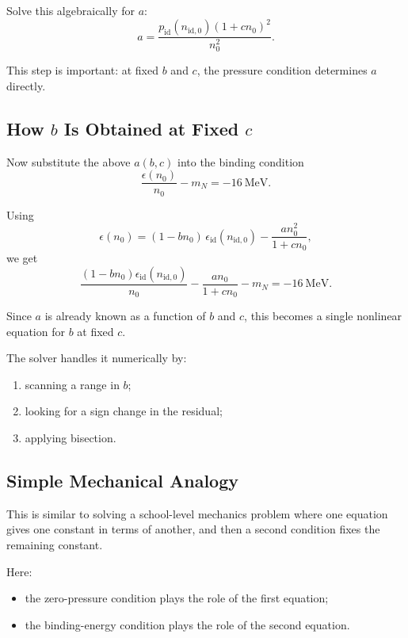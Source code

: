 \documentclass[11pt]{article}
\begin{document}
Solve this algebraically for $a$:
\begin{equation}
a
=
\frac{p_{\mathrm{id}}(n_{\mathrm{id},0})(1+cn_0)^2}{n_0^2}.
\end{equation}

This step is important: at fixed $b$ and $c$, the pressure condition determines
$a$ directly.

\subsection{How \texorpdfstring{$b$}{b} Is Obtained at Fixed \texorpdfstring{$c$}{c}}

Now substitute the above $a(b,c)$ into the binding condition
\begin{equation}
\frac{\epsilon(n_0)}{n_0}-m_N=-16\ \mathrm{MeV}.
\end{equation}

Using
\begin{equation}
\epsilon(n_0)
=
(1-bn_0)\,\epsilon_{\mathrm{id}}(n_{\mathrm{id},0})
-\frac{a n_0^2}{1+cn_0},
\end{equation}
we get
\begin{equation}
\frac{(1-bn_0)\epsilon_{\mathrm{id}}(n_{\mathrm{id},0})}{n_0}
-\frac{a n_0}{1+cn_0}
-m_N
=
-16\ \mathrm{MeV}.
\end{equation}

Since $a$ is already known as a function of $b$ and $c$, this becomes a single
nonlinear equation for $b$ at fixed $c$.

The solver handles it numerically by:
\begin{enumerate}
\item scanning a range in $b$;
\item looking for a sign change in the residual;
\item applying bisection.
\end{enumerate}

\subsection{Simple Mechanical Analogy}

This is similar to solving a school-level mechanics problem where one equation
gives one constant in terms of another, and then a second condition fixes the
remaining constant.

Here:
\begin{itemize}
\item the zero-pressure condition plays the role of the first equation;
\item the binding-energy condition plays the role of the second equation.
\end{itemize}
\end{document}
